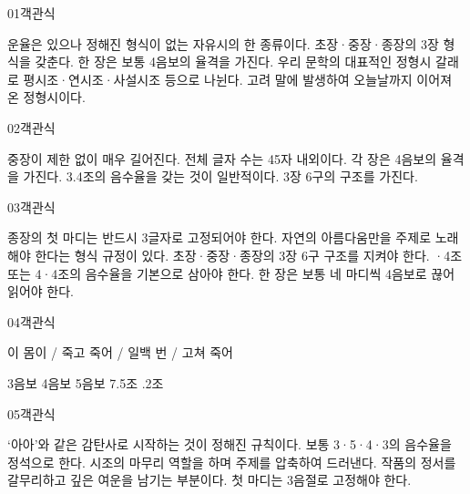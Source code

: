 \documentclass[fs85,seriesRus]{korfarm-base}
\begin{document}

\par\medskip
\kfBeginMC
\begin{kfQBlock}{01}{객관식}
\begin{kfChoices}
\kfChoice 운율은 있으나 정해진 형식이 없는 자유시의 한 종류이다.
\kfChoice 초장·중장·종장의 3장 형식을 갖춘다.
\kfChoice 한 장은 보통 4음보의 율격을 가진다.
\kfChoice 우리 문학의 대표적인 정형시 갈래로 평시조·연시조·사설시조 등으로 나뉜다.
\kfChoice 고려 말에 발생하여 오늘날까지 이어져 온 정형시이다.
\end{kfChoices}
\end{kfQBlock}
\begin{kfQBlock}{02}{객관식}
\begin{kfChoices}
\kfChoice 중장이 제한 없이 매우 길어진다.
\kfChoice 전체 글자 수는 45자 내외이다.
\kfChoice 각 장은 4음보의 율격을 가진다.
\kfChoice 3.4조의 음수율을 갖는 것이 일반적이다.
\kfChoice 3장 6구의 구조를 가진다.
\end{kfChoices}
\end{kfQBlock}
\begin{kfQBlock}{03}{객관식}
\begin{kfChoices}
\kfChoice 종장의 첫 마디는 반드시 3글자로 고정되어야 한다.
\kfChoice 자연의 아름다움만을 주제로 노래해야 한다는 형식 규정이 있다.
\kfChoice 초장·중장·종장의 3장 6구 구조를 지켜야 한다.
·4조 또는 4·4조의 음수율을 기본으로 삼아야 한다.
\kfChoice 한 장은 보통 네 마디씩 4음보로 끊어 읽어야 한다.
\end{kfChoices}
\end{kfQBlock}
\begin{kfQBlock}{04}{객관식}
\begin{kfEvidence}이 몸이 / 죽고 죽어 / 일백 번 / 고쳐 죽어\end{kfEvidence}
\begin{kfChoices}
\kfChoice 3음보
\kfChoice 4음보
\kfChoice 5음보
\kfChoice 7.5조
.2조
\end{kfChoices}
\end{kfQBlock}
\begin{kfQBlock}{05}{객관식}
\begin{kfChoices}
\kfChoice ‘아아’와 같은 감탄사로 시작하는 것이 정해진 규칙이다.
\kfChoice 보통 3·5·4·3의 음수율을 정석으로 한다.
\kfChoice 시조의 마무리 역할을 하며 주제를 압축하여 드러낸다.
\kfChoice 작품의 정서를 갈무리하고 깊은 여운을 남기는 부분이다.
\kfChoice 첫 마디는 3음절로 고정해야 한다.
\end{kfChoices}
\end{kfQBlock}
\end{document}
